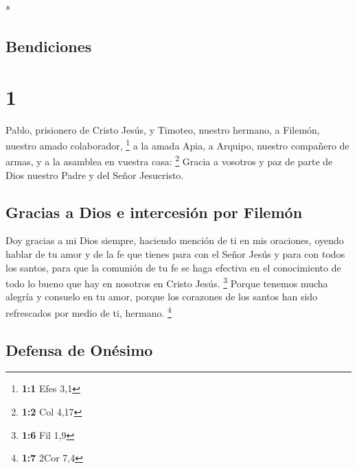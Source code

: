 \begin{paracol}{2} \switchcolumn[0]*

\hypertarget{bendiciones}{%
\subsection{Bendiciones}\label{bendiciones}}

\hypertarget{section}{%
\section{1}\label{section}}

 Pablo, prisionero de Cristo Jesús, y Timoteo, nuestro
hermano, a Filemón, nuestro amado colaborador, \footnote{\textbf{1:1}
  Efes 3,1}  a la amada Apia, a Arquipo, nuestro compañero
de armas, y a la asamblea en vuestra casa: \footnote{\textbf{1:2} Col
  4,17}  Gracia a vosotros y paz de parte de Dios nuestro
Padre y del Señor Jesucristo.

\hypertarget{gracias-a-dios-e-intercesiuxf3n-por-filemuxf3n}{%
\subsection{Gracias a Dios e intercesión por
Filemón}\label{gracias-a-dios-e-intercesiuxf3n-por-filemuxf3n}}

 Doy gracias a mi Dios siempre, haciendo mención de ti en
mis oraciones,  oyendo hablar de tu amor y de la fe que
tienes para con el Señor Jesús y para con todos los santos,
 para que la comunión de tu fe se haga efectiva en el
conocimiento de todo lo bueno que hay en nosotros en Cristo Jesús.
\footnote{\textbf{1:6} Fil 1,9}  Porque tenemos mucha
alegría y consuelo en tu amor, porque los corazones de los santos han
sido refrescados por medio de ti, hermano. \footnote{\textbf{1:7} 2Cor
  7,4}

\hypertarget{defensa-de-onuxe9simo}{%
\subsection{Defensa de Onésimo}\label{defensa-de-onuxe9simo}}


\end{paracol}
